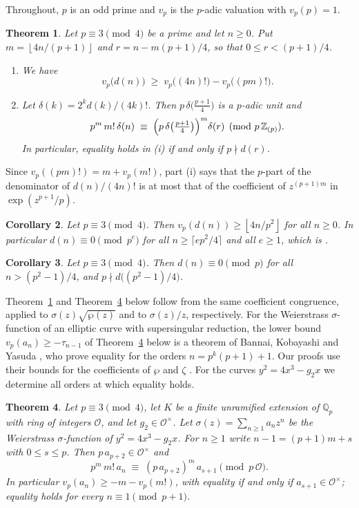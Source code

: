 \documentclass[11pt]{amsart}
\newtheorem{theorem}{Theorem}[section]
\newtheorem{corollary}[theorem]{Corollary}
\theoremstyle{definition}
\theoremstyle{remark}
\newcommand{\Z}{\mathbb{Z}}
\newcommand{\Q}{\mathbb{Q}}
\newcommand{\cO}{\mathcal{O}}
\newcommand{\fl}[1]{\left\lfloor #1 \right\rfloor}
\begin{document}
Throughout, $p$ is an odd prime and $v_p$ is the $p$-adic valuation with $v_p(p)=1$.

\begin{theorem}\label{thm:main}
Let $p\equiv3\pmod4$ be a prime and let $n\ge0$. Put $m=\fl{4n/(p+1)}$ and $r=n-m(p+1)/4$, so that
$0\le r<(p+1)/4$.
\begin{enumerate}
\item[(i)] We have
\[
v_p\bigl(d(n)\bigr)\;\ge\; v_p\bigl((4n)!\bigr)-v_p\bigl((pm)!\bigr).
\]
\item[(ii)] Let $\delta(k)=2^k d(k)/(4k)!$. Then $p\,\delta\bigl(\tfrac{p+1}{4}\bigr)$ is a $p$-adic unit and
\[
p^m\,m!\,\delta(n)\;\equiv\;\Bigl(p\,\delta\bigl(\tfrac{p+1}{4}\bigr)\Bigr)^{m} \delta(r)\pmod{p\,\Z_{(p)}} .
\]
In particular, equality holds in \textup{(i)} if and only if $p\nmid d(r)$.
\end{enumerate}
\end{theorem}

Since $v_p((pm)!)=m+v_p(m!)$, part (i) says that the $p$-part of the denominator of $d(n)/(4n)!$
is at most that of the coefficient of $z^{(p+1)m}$ in $\exp(z^{p+1}/p)$.

\begin{corollary}\label{cor:KM}
Let $p\equiv3\pmod4$. Then $v_p(d(n))\ge\fl{4n/p^2}$ for all $n\ge0$. In particular
$d(n)\equiv0\pmod{p^e}$ for all $n\ge\lceil ep^2/4\rceil$ and all $e\ge1$, which is
\cite[Conjecture~45]{KM}.
\end{corollary}

\begin{corollary}\label{cor:modp}
Let $p\equiv3\pmod4$. Then $d(n)\equiv0\pmod p$ for all $n>(p^2-1)/4$, and
$p\nmid d\bigl((p^2-1)/4\bigr)$.
\end{corollary}

Theorem~\ref{thm:main} and Theorem~\ref{thm:sigma} below follow from the same coefficient
congruence, applied to $\sigma(z)\sqrt{\wp(z)}$ and to $\sigma(z)/z$, respectively. For the
Weierstrass $\sigma$-function of an elliptic curve with supersingular reduction, the lower bound
$v_p(a_n)\ge-\tau_{n-1}$ of Theorem~\ref{thm:sigma} below is a theorem of Bannai, Kobayashi and
Yasuda \cite[Theorem~5.6]{BKY}, who prove equality for the orders $n=p^k(p+1)+1$. Our proofs use
their bounds for the coefficients of $\wp$ and $\zeta$ \cite[Corollaries~5.3, 5.5]{BKY}. For the
curves $y^2=4x^3-g_2x$ we determine all orders at which equality holds.

\begin{theorem}\label{thm:sigma}
Let $p\equiv3\pmod4$, let $K$ be a finite unramified extension of $\Q_p$ with ring of integers
$\cO$, and let $g_2\in\cO^\times$. Let $\sigma(z)=\sum_{n\ge1}a_nz^n$ be the Weierstrass
$\sigma$-function of $y^2=4x^3-g_2x$. For $n\ge1$ write $n-1=(p+1)m+s$ with $0\le s\le p$. Then
$p\,a_{p+2}\in\cO^\times$ and
\[
p^m\,m!\,a_n\;\equiv\;(p\,a_{p+2})^m\,a_{s+1}\pmod{p\,\cO}.
\]
In particular $v_p(a_n)\ge-m-v_p(m!)$, with equality if and only if $a_{s+1}\in\cO^\times$; equality
holds for every $n\equiv1\pmod{p+1}$.
\end{theorem}
\end{document}
